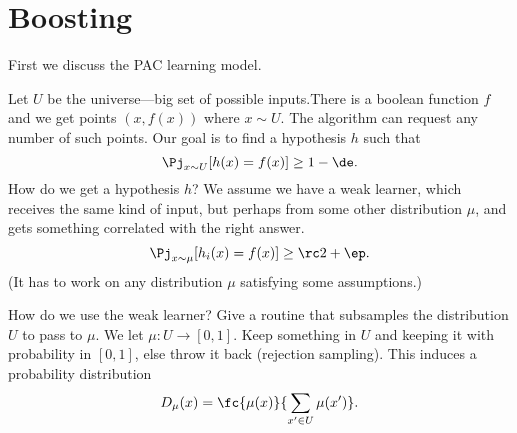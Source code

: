 \section{Boosting}

First we discuss the PAC learning model.

Let $U$ be the universe---big set of possible inputs.There is a boolean function $f$ and we get points $(x,f(x))$ where $x\sim U$. The algorithm can request any number of such points. Our goal is to find a hypothesis $h$ such that 
$$
\Pj_{x\sim U} [h(x)=f(x)]\ge 1-\de.
$$
How do we get a hypothesis $h$? We assume we have a weak learner, which receives the same kind of input, but perhaps from some other distribution $\mu$, and gets something correlated with the right answer.
$$
\Pj_{x\sim \mu} [h_i(x)=f(x)] \ge \rc 2+\ep.
$$
(It has to work on any distribution $\mu$ satisfying some assumptions.)

How do we use the weak learner?
Give a routine that subsamples the distribution $U$ to pass to $\mu$. 
We let $\mu:U\to [0,1]$. Keep something in $U$ and keeping it with probability in $[0,1]$, else throw it back (rejection sampling). This induces a probability distribution
$$
D_\mu(x) = \fc{\mu(x)}{\sum_{x'\in U}\mu(x')}.
$$


